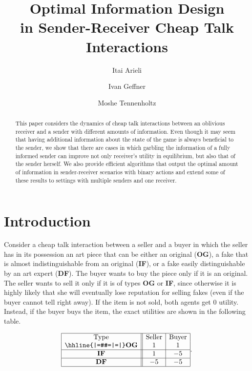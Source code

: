 \documentclass[submission,copyright,creativecommons]{eptcs}
\title{Optimal Information Design \\ in Sender-Receiver Cheap Talk Interactions}
\author{Itai Arieli
\institute{Technion\\ Haifa, Israel}
\email{iarieli@technion.ac.il}
\and
Ivan Geffner
\institute{Utrecht University\\
Utrecht, Netherlands}
\email{i.e.geffnerfuenmayor@uu.nl}
\and
Moshe Tennenholtz
\institute{Technion\\ Haifa, Israel}
\email{moshet@technion.ac.il}
}
\begin{document}
\maketitle

\begin{abstract}
This paper considers the dynamics of cheap talk interactions between an oblivious receiver and a sender with different amounts of information. Even though it may seem that having additional information about the state of the game is always beneficial to the sender, we show that there are cases in which garbling the information of a fully informed sender can improve not only receiver's utility in equilibrium, but also that of the sender herself. We also provide efficient algorithms that output the optimal amount of information in sender-receiver scenarios with binary actions and extend some of these results to settings with multiple senders and one receiver.
\end{abstract}

\section{Introduction}

 Consider a cheap talk interaction between a seller and a buyer in which the seller has in its possession an art piece that can be either an original (\textbf{OG}), a fake that is almost indistinguishable from an original (\textbf{IF}), or a fake easily distinguishable by an art expert (\textbf{DF}). The buyer wants to buy the piece only if it is an original. The seller wants to sell it only if it is of types \textbf{OG} or \textbf{IF}, since otherwise it is highly likely that she will eventually lose reputation for selling fakes (even if the buyer cannot tell right away). If the item is not sold, both agents get $0$ utility. Instead, if the buyer buys the item, the exact utilities are shown in the following table.

$$\begin{array}{|c||c|c|}
\hline
\mbox{Type} & \mbox{Seller} & \mbox{Buyer}\\
\hhline{|=#=|=|}
\mbox{\textbf{OG}} & 1 & 1 \\
\hline
\mbox{\textbf{IF}} & 1 & -5\\
\hline
\mbox{\textbf{DF}} & -5 & -5\\
\hline
\end{array}.$$
\end{document}
